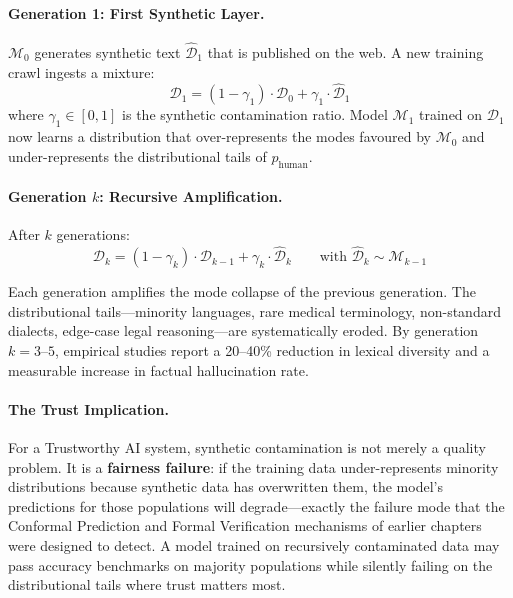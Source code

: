 \paragraph{Generation 1: First Synthetic Layer.}
$\mathcal{M}_0$ generates synthetic text $\hat{\mathcal{D}}_1$
that is published on the web.
A new training crawl ingests a mixture:
\begin{equation}
  \label{eq:contaminated-distribution}
  \mathcal{D}_1
    = (1 - \gamma_1) \cdot \mathcal{D}_0
    + \gamma_1 \cdot \hat{\mathcal{D}}_1
\end{equation}
where $\gamma_1 \in [0, 1]$ is the synthetic contamination
ratio.
Model $\mathcal{M}_1$ trained on $\mathcal{D}_1$ now
learns a distribution that over-represents the modes
favoured by $\mathcal{M}_0$ and under-represents the
distributional tails of $p_{\mathrm{human}}$.

\paragraph{Generation $k$: Recursive Amplification.}
After $k$ generations:
\begin{equation}
  \label{eq:recursive-collapse}
  \mathcal{D}_k
    = (1 - \gamma_k) \cdot \mathcal{D}_{k-1}
    + \gamma_k \cdot \hat{\mathcal{D}}_k
  \qquad
  \text{with } \hat{\mathcal{D}}_k \sim \mathcal{M}_{k-1}
\end{equation}

Each generation amplifies the mode collapse of the previous
generation.
The distributional tails---minority languages, rare medical
terminology, non-standard dialects, edge-case legal
reasoning---are systematically eroded.
By generation $k = 3$--$5$, empirical studies report a
20--40\% reduction in lexical diversity and a measurable
increase in factual hallucination rate.

\paragraph{The Trust Implication.}
For a Trustworthy AI system, synthetic contamination is not
merely a quality problem.
It is a \textbf{fairness failure}: if the training data
under-represents minority distributions because synthetic
data has overwritten them, the model's predictions for those
populations will degrade---exactly the failure mode that the
Conformal Prediction and Formal Verification mechanisms of
earlier chapters were designed to detect.
A model trained on recursively contaminated data may pass
accuracy benchmarks on majority populations while silently
failing on the distributional tails where trust matters most.

